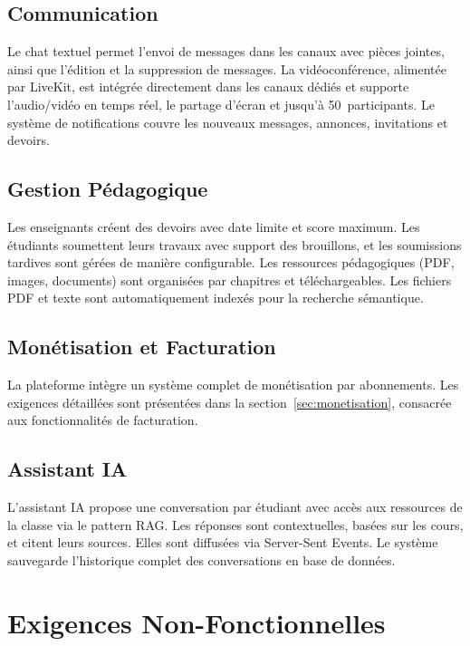 \documentclass[12pt, a4paper, twoside]{report}
\begin{document}
\subsection{Communication}

Le chat textuel permet l'envoi de messages dans les canaux avec pièces jointes,
ainsi que l'édition et la suppression de messages. La vidéoconférence, alimentée
par LiveKit, est intégrée directement dans les canaux dédiés et supporte
l'audio/vidéo en temps réel, le partage d'écran et jusqu'à 50~participants. Le
système de notifications couvre les nouveaux messages, annonces, invitations et
devoirs.

\subsection{Gestion Pédagogique}

Les enseignants créent des devoirs avec date limite et score maximum. Les étudiants
soumettent leurs travaux avec support des brouillons, et les soumissions tardives
sont gérées de manière configurable. Les ressources pédagogiques (PDF, images,
documents) sont organisées par chapitres et téléchargeables. Les fichiers PDF et
texte sont automatiquement indexés pour la recherche sémantique.

\subsection{Monétisation et Facturation}

La plateforme intègre un système complet de monétisation par abonnements. Les
exigences détaillées sont présentées dans la section~\ref{sec:monetisation},
consacrée aux fonctionnalités de facturation.

\subsection{Assistant IA}

L'assistant IA propose une conversation par étudiant avec accès aux ressources de
la classe via le pattern RAG. Les réponses sont contextuelles, basées sur les
cours, et citent leurs sources. Elles sont diffusées via Server-Sent Events. Le
système sauvegarde l'historique complet des conversations en base de données.

\section{Exigences Non-Fonctionnelles}
\end{document}
